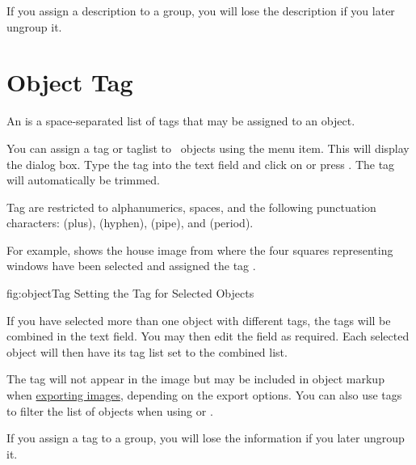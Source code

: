 \begin{important}
If you assign a description to a \gls{group},
you will lose the description if you later ungroup it.
\end{important}

\section{Object Tag}\label{sec:objecttag}

An  is a space-separated list of tags
that may be assigned to an object.


You can assign a tag or \gls{taglist} to \selected\ \glspl*{object} using the
 menu item.  This will display the
 dialog box. Type the tag into the text field and click
on  or press . The tag will
automatically be trimmed.

\begin{important}
Tag are restricted to alphanumerics, spaces, and the following
punctuation characters: \code{+} (plus), \code{-} (hyphen), 
\code{|} (pipe), and  (period).
\end{important}

For example,  shows the house
image from  where the four squares
representing windows have been selected and assigned the tag
.

\FloatFig
 {fig:objectTag}
 {}
 {Setting the Tag for Selected Objects}

\begin{information}
If you have selected more than one \gls{object} with different tags,
the tags will be combined in the text field. You may then edit the
field as required. Each selected \gls{object} will then have its
tag list set to the combined list.
\end{information}

The tag will not appear in the image but may be included in
object markup when \hyperref[sec:exportimage]{exporting images},
depending on the export options. You can also use tags to filter the
list of objects when using 
or .

\begin{important}
If you assign a tag to a \gls{group},
you will lose the information if you later ungroup it.
\end{important}

